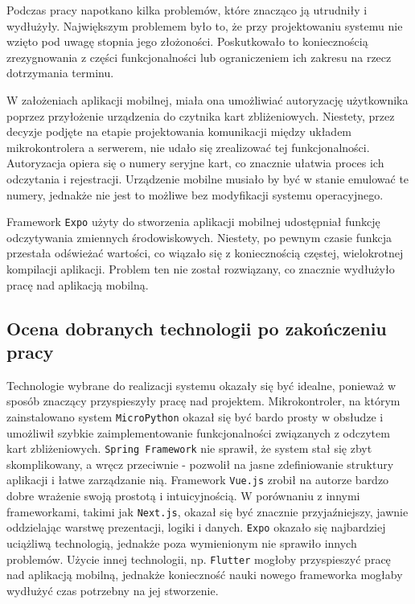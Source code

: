 Podczas pracy napotkano kilka problemów, które znacząco ją utrudniły i wydłużyły. Największym problemem było to, że przy projektowaniu systemu nie wzięto pod uwagę stopnia jego złożoności. Poskutkowało to koniecznością zrezygnowania z części funkcjonalności lub ograniczeniem ich zakresu na rzecz dotrzymania terminu.

W założeniach aplikacji mobilnej, miała ona umożliwiać autoryzację użytkownika poprzez przyłożenie urządzenia do czytnika kart zbliżeniowych. Niestety, przez decyzje podjęte na etapie projektowania komunikacji między układem mikrokontrolera a serwerem, nie udało się zrealizować tej funkcjonalności. Autoryzacja opiera się o numery seryjne kart, co znacznie ułatwia proces ich odczytania i rejestracji. Urządzenie mobilne musiało by być w stanie emulować te numery, jednakże nie jest to możliwe bez modyfikacji systemu operacyjnego.

Framework \texttt{Expo} użyty do stworzenia aplikacji mobilnej udostępniał funkcję odczytywania zmiennych środowiskowych. Niestety, po pewnym czasie funkcja przestała odświeżać wartości, co wiązało się z koniecznością częstej, wielokrotnej kompilacji aplikacji. Problem ten nie został rozwiązany, co znacznie wydłużyło pracę nad aplikacją mobilną.

\subsection{Ocena dobranych technologii po zakończeniu pracy}

Technologie wybrane do realizacji systemu okazały się być idealne, ponieważ w sposób znaczący przyspieszyły pracę nad projektem. Mikrokontroler, na którym zainstalowano system \texttt{MicroPython} okazał się być bardo prosty w obsłudze i umożliwił szybkie zaimplementowanie funkcjonalności związanych z odczytem kart zbliżeniowych. \texttt{Spring Framework} nie sprawił, że system stał się zbyt skomplikowany, a wręcz przeciwnie - pozwolił na jasne zdefiniowanie struktury aplikacji i łatwe zarządzanie nią. Framework \texttt{Vue.js} zrobił na autorze bardzo dobre wrażenie swoją prostotą i intuicyjnością. W porównaniu z innymi frameworkami, takimi jak \texttt{Next.js}, okazał się być znacznie przyjaźniejszy, jawnie oddzielając warstwę prezentacji, logiki i danych. \texttt{Expo} okazało się najbardziej uciążliwą technologią, jednakże poza wymienionym nie sprawiło innych problemów. Użycie innej technologii, np. \texttt{Flutter} mogłoby przyspieszyć pracę nad aplikacją mobilną, jednakże konieczność nauki nowego frameworka mogłaby wydłużyć czas potrzebny na jej stworzenie.

